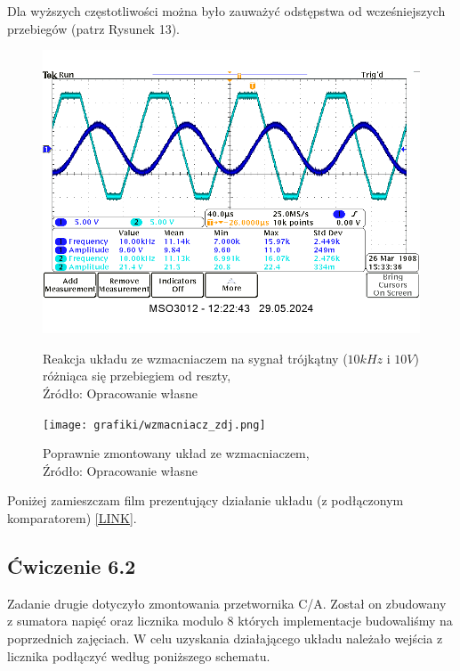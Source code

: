 \documentclass{article}
\begin{document}
        Dla wyższych częstotliwości można było zauważyć odstępstwa od wcześniejszych przebiegów (patrz Rysunek 13).

        \begin{figure}[!ht]
          \begin{minipage}{.5\textwidth}
            \centering
            \includegraphics[scale=0.3]{grafiki/wzmacniacz_10kHz_10V_sin_10kOhm.png}
            \caption{Reakcja układu ze wzmacniaczem na sygnał trójkątny ($10kHz$ i $10V$) różniąca się przebiegiem od reszty,
            \\Źródło: Opracowanie własne}
          \end{minipage}
          \begin{minipage}{.5\textwidth}
            \centering
            \texttt{[image: grafiki/wzmacniacz\_zdj.png]}
            \caption{Poprawnie zmontowany układ ze wzmacniaczem,
            \\Źródło: Opracowanie własne}
          \end{minipage}
        \end{figure}

        Poniżej zamieszczam film prezentujący działanie układu (z podłączonym komparatorem) \href{https://youtu.be/iaurY3viG4w}{[LINK]}.

    \subsection{Ćwiczenie 6.2}
      Zadanie drugie dotyczyło zmontowania przetwornika C/A. Został on zbudowany z sumatora napięć oraz licznika modulo 8 których implementacje budowaliśmy na poprzednich zajęciach. W celu uzyskania działającego układu należało wejścia z licznika podłączyć według poniższego schematu.
\end{document}
